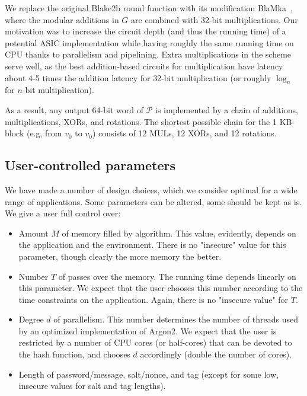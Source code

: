 \documentclass[a4paper]{article}
\begin{document}
We replace the original Blake2b round function 
with its modification BlaMka~\cite{cryptoeprint:2015:136}, where the modular additions in $G$ are combined with 32-bit multiplications. Our motivation was to increase the circuit depth (and thus the running time) of a potential ASIC implementation while having roughly the same running time on CPU thanks to parallelism and pipelining. Extra multiplications in the scheme serve well, as the best addition-based circuits for multiplication have latency about 4-5 times the addition latency for 32-bit multiplication (or roughly $\log_n$ for $n$-bit multiplication).

As a result, any output 64-bit word of  $\mathcal{P}$  is implemented by a chain of additions, multiplications, XORs, and rotations. The shortest possible chain for the 1 KB-block (e.g, from $v_0$  to $v_0$) consists of 12 MULs, 12 XORs, and 12 rotations.



\subsection{User-controlled parameters}

We have made a number of design choices, which we consider optimal for a wide range of applications. Some parameters can be altered, some should be kept as is. We give a user full control over:
\begin{itemize}
  \item Amount $M$ of memory filled by algorithm. This value, evidently, depends on the application and the environment. There is no "insecure" value for this parameter, though clearly the more memory the better.
  \item Number $T$ of passes over the memory. The running  time depends linearly on this parameter. We expect that the user chooses this number according to the time constraints on the application. Again, there is no "insecure value" for $T$.
  \item Degree $d$ of parallelism. This number determines the number of threads used by an optimized implementation of \textsf{Argon2}. We expect that the user is restricted by a number of CPU cores (or half-cores) that can be devoted to the hash function, and chooses $d$ accordingly (double the number of cores).
  \item Length of password/message, salt/nonce, and tag (except for some low, insecure values for salt and tag lengths).
\end{itemize}
\end{document}
